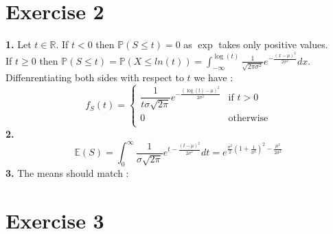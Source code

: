 \documentclass{article}
\begin{document}
\section*{Exercise 2}
\textbf{1.} Let $t\in\mathbb{R}$. If $t<0$ then $\mathbb{P}(S\leq t) = 0$ as $\exp$ takes only positive values.
\\
If $t\ge 0$ then $\mathbb{P}(S\leq t) = \mathbb{P}(X\leq ln(t)) = \int_{-\infty}^{\log(t)}\frac{1}{\sqrt{2\pi\sigma^2}}e^{-\frac{(x-\mu)^2}{2\sigma^2}}dx$. Diffenrentiating both sides with respect to $t$ we have : $$\boxed{f_S(t) =\left\{\begin{array}{cl}
    \dfrac{1}{t\sigma\sqrt{2\pi}}e^{-\frac{(\log(t)-\mu)^2}{2\sigma^2}}& \text{if }t>0\\
    0&\text{otherwise}\\
\end{array} \right.}$$
\textbf{2.} $$\boxed{\mathbb{E}(S) = \displaystyle\int_0^\infty \dfrac{1}{\sigma\sqrt{2\pi}}e^{t-\frac{(t-\mu)^2}{2\sigma^2}}dt = e^{\frac{\sigma^2}{2}(1+\frac{1}{\sigma^2})^2-\frac{\mu^2}{2\sigma^2}}}$$
\textbf{3.} The means should match :




\section*{Exercise 3}
\end{document}
